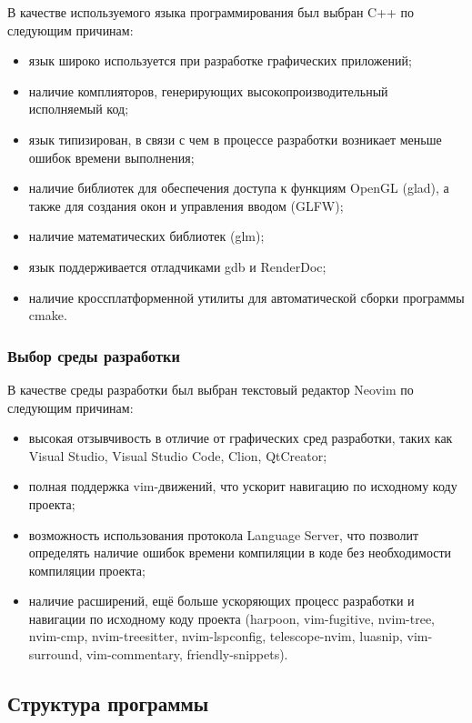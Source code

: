 В качестве используемого языка программирования был выбран C++ по следующим причинам:
\begin{itemize}
    \item язык широко используется при разработке графических приложений;
    \item наличие комплияторов, генерирующих высокопроизводительный исполняемый код;
    \item язык типизирован, в связи с чем в процессе разработки возникает меньше ошибок времени выполнения;
    \item наличие библиотек для обеспечения доступа к функциям OpenGL (glad), а также для создания окон и управления вводом (GLFW);
    \item наличие математических библиотек (glm);
    \item язык поддерживается отладчиками gdb и RenderDoc;
    \item наличие кроссплатформенной утилиты для автоматической сборки программы cmake.
\end{itemize}

\subsubsection{Выбор среды разработки}

В качестве среды разработки был выбран текстовый редактор Neovim по следующим причинам:
\begin{itemize}
    \item высокая отзывчивость в отличие от графических сред разработки, таких как Visual Studio, Visual Studio Code, Clion, QtCreator;
    \item полная поддержка vim-движений, что ускорит навигацию по исходному коду проекта;
    \item возможность использования протокола Language Server, что позволит определять наличие ошибок времени компиляции в коде без необходимости компиляции проекта;
    \item наличие расширений, ещё больше ускоряющих процесс разработки и навигации по исходному коду проекта (harpoon, vim-fugitive, nvim-tree, nvim-cmp, nvim-treesitter, nvim-lspconfig, telescope-nvim, luasnip, vim-surround, vim-commentary, friendly-snippets).
\end{itemize}

\subsection{Структура программы}

